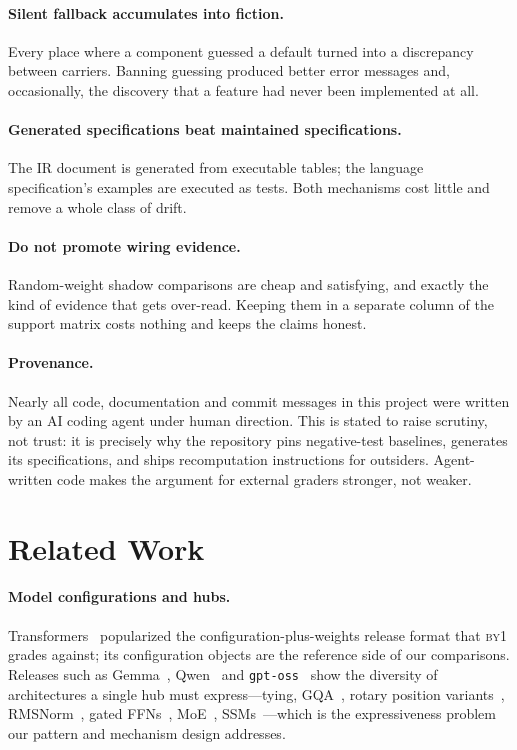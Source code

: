 \documentclass[11pt,a4paper]{article}
\newcommand{\code}[1]{\texttt{#1}}
\newcommand{\byone}{\textsc{by1}}
\begin{document}
\paragraph{Silent fallback accumulates into fiction.} Every place where a
component guessed a default turned into a discrepancy between carriers.
Banning guessing produced better error messages and, occasionally, the
discovery that a feature had never been implemented at all.

\paragraph{Generated specifications beat maintained specifications.} The IR
document is generated from executable tables; the language specification's
examples are executed as tests. Both mechanisms cost little and remove a
whole class of drift.

\paragraph{Do not promote wiring evidence.} Random-weight shadow comparisons
are cheap and satisfying, and exactly the kind of evidence that gets
over-read. Keeping them in a separate column of the support matrix costs
nothing and keeps the claims honest.

\paragraph{Provenance.} Nearly all code, documentation and commit messages in
this project were written by an AI coding agent under human direction. This
is stated to raise scrutiny, not trust: it is precisely why the repository
pins negative-test baselines, generates its specifications, and ships
recomputation instructions for outsiders. Agent-written code makes the
argument for external graders stronger, not weaker.

\section{Related Work}

\paragraph{Model configurations and hubs.} Transformers~\cite{wolf2020transformers}
popularized the configuration-plus-weights release format that \byone{}
grades against; its configuration objects are the reference side of our
comparisons. Releases such as Gemma~\cite{gemma2024},
Qwen~\cite{qwen2025qwen25} and \code{gpt-oss}~\cite{gptoss2025} show the
diversity of architectures a single hub must express---tying,
GQA~\cite{ainslie2023gqa}, rotary position variants~\cite{su2021roformer,
peng2023yarn}, RMSNorm~\cite{zhang2019rmsnorm}, gated
FFNs~\cite{shazeer2020glu}, MoE~\cite{fedus2022switch},
SSMs~\cite{daogu2023mamba}---which is the expressiveness problem our pattern
and mechanism design addresses.
\end{document}
